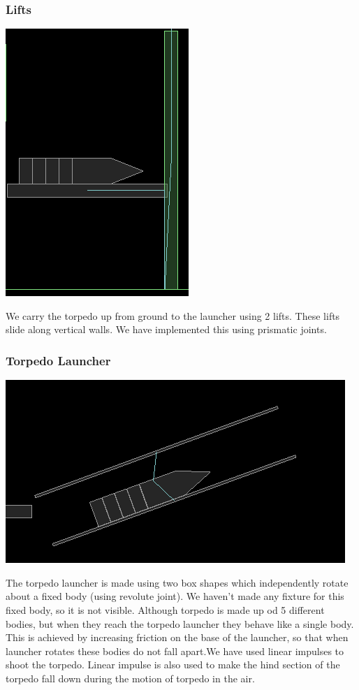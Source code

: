 \documentclass[11pt]{article}
\begin{document}
\subsubsection{Lifts}
\begin{center}
 \includegraphics[scale=0.5]{images/lift}
 \end{center}
We carry the torpedo up from ground to the launcher using 2 lifts. These lifts
slide along vertical walls. We have implemented this using prismatic joints.
\subsubsection{Torpedo Launcher}
\begin{center}
 \includegraphics[scale=0.5]{images/launcher}
 \end{center}
The torpedo launcher is made using two box shapes which independently rotate about a fixed body (using revolute joint). 
We haven't made any fixture for this fixed body, so it is not visible. Although torpedo is made up od 5 different bodies, but when they reach 
the torpedo launcher they behave like a single body. This is achieved by increasing friction on the base of the launcher, so that
when launcher rotates these bodies do not  fall apart.We have used linear impulses to shoot the torpedo. Linear impulse is also used to make the hind section of the torpedo fall down during
the motion of torpedo in the air.
\end{document}
